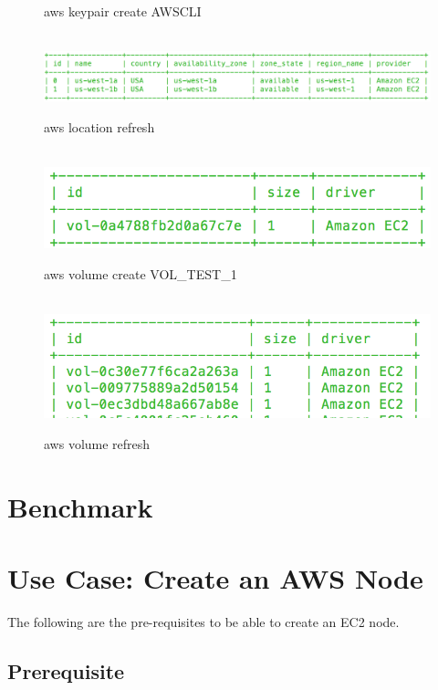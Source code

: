 \documentclass[9pt,twocolumn,twoside]{../../styles/osajnl}
\begin{document}
\begin{figure}[htb]
  \vspace{-1.5\baselineskip}
  \caption{aws keypair create AWSCLI}
  \label{fig:keypaircreate}
~\newline
  \centering
  \includegraphics[width=\linewidth]{images/cms_aws_location_list.png}
  \vspace{-1.5\baselineskip}
  \caption{aws location refresh}
  \label{fig:locationlist}
~\newline
  \centering
  \includegraphics[width=0.5\linewidth]{images/cms_aws_volume_create_VOL_TEST_1.png}
  \vspace{-0.5\baselineskip}
  \caption{aws volume create VOL\_TEST\_1}
  \label{fig:createvolume}
~\newline
  \centering
  \includegraphics[width=0.5\linewidth]{images/cms_aws_volume_list.png}
  \caption{aws volume refresh}
  \label{fig:volumelist}
\end{figure}
    
\section{Benchmark}


\section{Use Case: Create an AWS Node}
	The following are the pre-requisites to be able to create an EC2 node.

\subsection{Prerequisite}
\end{document}
